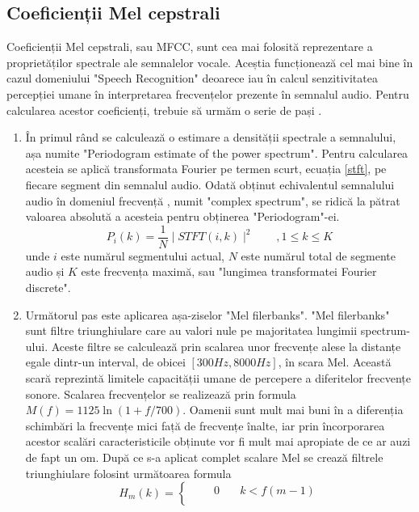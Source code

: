 \documentclass[a4paper,12pt]{book}
\begin{document}
			\subsection{Coeficienții Mel cepstrali}
				Coeficienții Mel cepstrali, sau MFCC, sunt cea mai folosită reprezentare a proprietăților spectrale ale semnalelor vocale. Aceștia funcționează cel mai bine în cazul domeniului "Speech Recognition" deoarece iau în calcul senzitivitatea percepției umane în interpretarea frecvențelor prezente în semnalul audio. Pentru calcularea acestor coeficienți, trebuie să urmăm o serie de pași \cite{mcs}.
					\begin{enumerate}
						\item 
							În primul rând se calculează o estimare a densității spectrale a semnalului, așa numite "Periodogram estimate of the power spectrum". Pentru calcularea acesteia se aplică transformata Fourier pe termen scurt, ecuația \ref{stft}, pe fiecare segment din semnalul audio. Odată obținut echivalentul semnalului audio în domeniul frecvență , numit "complex spectrum", se ridică la pătrat valoarea absolută a acesteia pentru obținerea "Periodogram"-ei.
							\begin{equation*}
								P_i(k) =\frac{1}{N}\mid STFT(i, k)\mid^2 \quad\quad,1\leq k\leq K
							\end{equation*}
							unde $i$ este numărul segmentului actual, $N$ este numărul total de segmente audio și $K$ este frecvența maximă, sau "lungimea transformatei Fourier discrete".
							\item Următorul pas este aplicarea așa-ziselor "Mel filerbanks". "Mel filerbanks" sunt filtre triunghiulare care au valori nule pe majoritatea lungimii spectrum-ului. Aceste filtre se calculează prin scalarea unor frecvențe alese la distanțe egale dintr-un interval, de obicei $[300Hz, 8000Hz]$, în scara Mel. Această scară reprezintă limitele capacității umane de percepere a diferitelor frecvențe sonore. Scalarea frecvențelor se realizează prin formula $M(f) = 1125 \ln(1+ f/700)$. Oamenii sunt mult mai buni în a diferenția schimbări la frecvențe mici față de frecvențe înalte, iar prin încorporarea acestor scalări caracteristicile obținute vor fi mult mai apropiate de ce ar auzi de fapt un om. \newline
							După ce s-a aplicat complet scalare Mel se crează filtrele triunghiulare folosint următoarea formula
						\begin{equation*}
							H_m(k) = 
							\begin{cases}
							\quad \quad 0&\quad k<f(m-1) \\[3pt]

\end{cases}
\end{equation*}
\end{enumerate}
\end{document}
